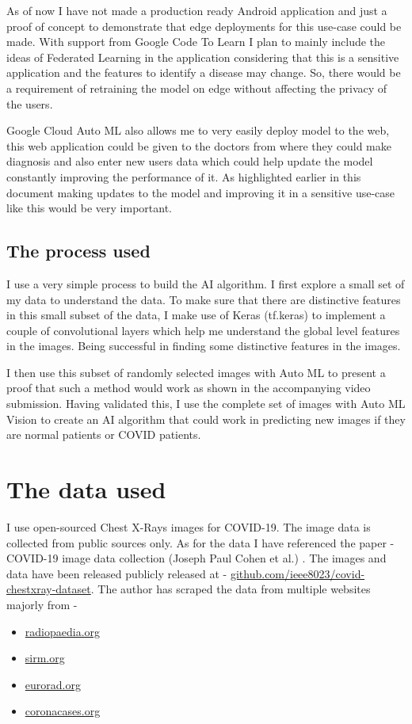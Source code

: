 \documentclass[a4paper]{article}
\begin{document}
\qquad As of now I have not made a production ready Android application and just a proof of concept to demonstrate that edge deployments for this use-case could be made. With support from Google Code To Learn I plan to mainly include the ideas of Federated Learning in the application considering that this is a sensitive application and the features to identify a disease may change. So, there would be a requirement of retraining the model on edge without affecting the privacy of the users.

\qquad Google Cloud Auto ML also allows me to very easily deploy model to the web, this web application could be given to the doctors from where they could make diagnosis and also enter new users data which could help update the model constantly improving the performance of it. As highlighted earlier in this document making updates to the model and improving it in a sensitive use-case like this would be very important.

\subsection{The process used}

\qquad I use a very simple process to build the AI algorithm. I first explore a small set of my data to understand the data. To make sure that there are distinctive features in this small subset of the data, I make use of Keras (tf.keras) to implement a couple of convolutional layers which help me understand the global level features in the images. Being successful in finding some distinctive features in the images.

\qquad I then use this subset of randomly selected images with Auto ML to present a proof that such a method would work as shown in the accompanying video submission. Having validated this, I use the complete set of images with Auto ML Vision to create an AI algorithm that could work in predicting new images if they are normal patients or COVID patients.

\section{The data used}

\qquad I use open-sourced Chest X-Rays images for COVID-19. The image data is collected from public sources only. As for the data I have referenced the paper - COVID-19 image data collection (Joseph Paul Cohen et al.) \cite{cohen2020covid19}. The images and data have been released publicly released at \cite{cohen2020covid} -  \href{https://github.com/ieee8023/covid-chestxray-dataset}{github.com/ieee8023/covid-chestxray-dataset}. The author has scraped the data from multiple websites majorly from - 
\begin{itemize}
    \item \href{https://radiopaedia.org/}{radiopaedia.org}
    \item \href{https://www.sirm.org/category/senza-categoria/covid-19/}{sirm.org}
    \item \href{https://www.eurorad.org/}{eurorad.org}
    \item \href{https://coronacases.org/}{coronacases.org}
\end{itemize}
\end{document}
